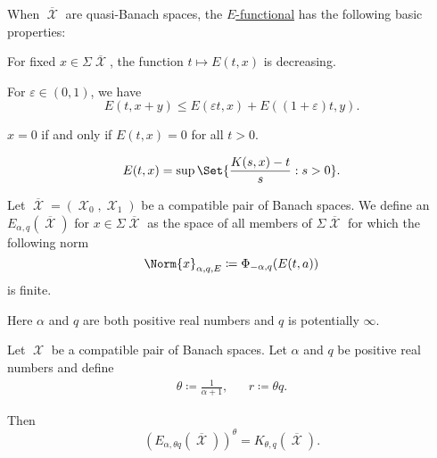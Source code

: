 \begin{proposition}\label{thm:e_functional_properties}
  When \( \overline{\mscrX} \) are quasi-Banach spaces, the \hyperref[def:e_functional]{\( E \)-functional} has the following basic properties:

  \begin{PropEnum}
     For fixed \( x \in \Sigma\overline{\mscrX} \), the function \( t \mapsto E(t, x) \) is decreasing.

     For \( \varepsilon \in (0, 1) \), we have
    \begin{equation*}
      E(t, x + y) \leq E(\varepsilon t, x) + E((1 + \varepsilon) t, y).
    \end{equation*}

     \( x = 0 \) if and only if \( E(t, x) = 0 \) for all \( t > 0 \).

    \begin{equation*}
      E(t, x) = \sup \Set{ \frac {K(s, x) - t} s : s > 0 }.
    \end{equation*}
  \end{PropEnum}
\end{proposition}

\begin{definition}\label{def:approximation_space}
  Let \( \overline{\mscrX} = (\mscrX_0, \mscrX_1) \) be a compatible pair of Banach spaces. We define an  \( E_{\alpha,q}(\overline{\mscrX}) \) for \( x \in \Sigma\overline{\mscrX} \) as the space of all members of \( \Sigma\overline{\mscrX} \) for which the following norm
  \begin{equation}\label{eq:def:approximation_space/norm}
    \Norm{x}_{\alpha,q,E} \coloneqq \Phi_{-\alpha,q}(E(t,a))
  \end{equation}
  is finite.

  Here \( \alpha \) and \( q \) are both positive real numbers and \( q \) is potentially \( \infty \).
\end{definition}

\begin{theorem}\label{thm:interpolation_space_and_approximation_space}
  Let \( \mscrX \) be a compatible pair of Banach spaces. Let \( \alpha \) and \( q \) be positive real numbers and define
  \begin{align*}
    \theta \coloneqq \frac 1 {\alpha + 1},
    &&
    r \coloneqq \theta q.
  \end{align*}

  Then
  \begin{equation*}
    (E_{\alpha,\theta q}(\overline{\mscrX}))^\theta = K_{\theta,q}(\overline{\mscrX}).
  \end{equation*}
\end{theorem}

